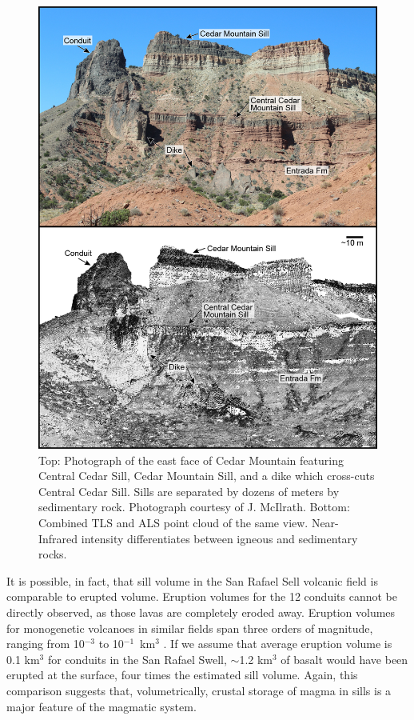 \documentclass[12pt,letter]{article}
\begin{document}
\begin{figure}
\centering
\includegraphics[width=0.7\linewidth]{figures/SFig2-photo_pcloud}
\caption{Top: Photograph of the east face of Cedar Mountain featuring Central Cedar Sill, Cedar Mountain Sill, and a dike which cross-cuts Central Cedar Sill. Sills are separated by dozens of meters by sedimentary rock. Photograph courtesy of J. McIlrath. Bottom: Combined TLS and ALS point cloud of the same view. Near-Infrared intensity differentiates between igneous and sedimentary rocks.}
\label{fig_photo-pcloud}
\end{figure}

It is possible, in fact, that sill volume in the San Rafael Sell volcanic field is comparable to erupted volume. Eruption volumes for the 12 conduits cannot be directly observed, as those lavas are completely eroded away. Eruption volumes for monogenetic volcanoes in similar fields span three orders of magnitude, ranging from 10$^{-3}$ to 10$^{-1}$~km$^3$ \citep[e.g.]{crowe1983aspects, condit1989patterns, kiyosugi2012relationship}. If we assume that average eruption volume is 0.1 km$^3$ for conduits in the San Rafael Swell, $\sim$1.2 km$^3$ of basalt would have been erupted at the surface, four times the estimated sill volume. Again, this comparison suggests that, volumetrically, crustal storage of magma in sills is a major feature of the magmatic system.
\end{document}
